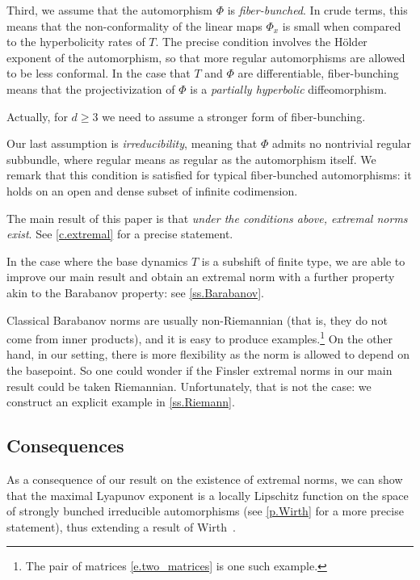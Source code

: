 \documentclass[JEP,XML,SOM,Unicode]{cedram}
\theoremstyle{plain}
\theoremstyle{definition}
\begin{document}
Third, we assume that the automorphism $\Phi$ is \emph{fiber-bunched}.
In crude terms, this means that the non-conformality of the linear maps $\Phi_x$ is small when compared to the hyperbolicity rates of $T$. The precise condition involves the Hölder exponent of the automorphism, so that more regular automorphisms are allowed to be less conformal. In the case that $T$ and $\Phi$ are differentiable, fiber-bunching means that the projectivization of $\Phi$ is a \emph{partially hyperbolic} diffeomorphism.

Actually, for $d \ge 3$ we need to assume a stronger form of fiber-bunching.

Our last assumption is \emph{irreducibility}, meaning that $\Phi$ admits no nontrivial regular subbundle, where regular means as regular as the automorphism itself.
We remark that this condition is satisfied for typical fiber-bunched automorphisms: it holds on an open and dense subset of infinite codimension.

The main result of this paper is that \emph{under the conditions above, extremal norms exist}. See \cref{c.extremal} for a precise statement.

In the case where the base dynamics $T$ is a subshift of finite type, we are able to improve our main result and obtain an extremal norm with a further property akin to the Barabanov property: see \cref{ss.Barabanov}.

Classical Barabanov norms are usually non-Riemannian (that is, they do not come from inner products), and it is easy to produce examples.\footnote{The pair of matrices \eqref{e.two_matrices} is one such example.} On the other hand, in our setting, there is more flexibility as the norm is allowed to depend on the basepoint. So one could wonder if the Finsler extremal norms in our main result could be taken Riemannian. Unfortunately, that is not the case: we construct an explicit example in \cref{ss.Riemann}.

\subsection{Consequences}

As a consequence of our result on the existence of extremal norms, we can show that the maximal Lyapunov exponent is a locally Lipschitz function on the space of strongly bunched irreducible automorphisms (see \cref{p.Wirth} for a more precise statement), thus extending a result of Wirth~\cite{Wirth}.
\end{document}

